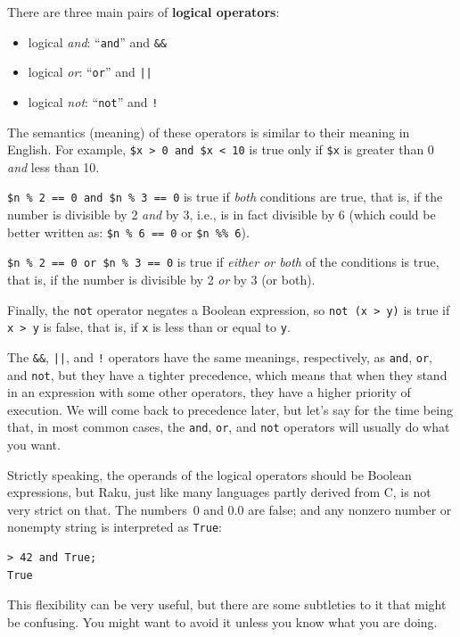 There are three main pairs of {\bf logical operators}: 
\begin{itemize}
\item logical \emph{and}: ``{\tt and}'' and {\tt \&\&}
\item logical \emph{or}: ``{\tt or}'' and {\tt ||}
\item logical \emph{not}: ``{\tt not}'' and {\tt !}
\end{itemize}

The semantics (meaning) of these operators is
similar to their meaning in English.  For example,
{\tt \$x > 0 and \$x < 10} is true only if {\tt \$x} is greater 
than 0 {\em and} less than 10.

{\tt \$n \% 2 == 0 and \$n \% 3 == 0} is true if {\em both} 
conditions are true, that is, if the number is divisible by 2
{\em and} by 3, i.e., is in fact divisible by 6 (which could be better 
written as: {\tt \$n \% 6 == 0} or {\tt \$n \%\% 6}).

{\tt \$n \% 2 == 0 or \$n \% 3 == 0} is true if {\em either or 
both} of the conditions is true, that is, if the number is 
divisible by 2 {\em or} by 3 (or both).

Finally, the {\tt not} operator negates a Boolean
expression, so {\tt not (x > y)} is true if {\tt x > y} 
is false, that is, if {\tt x} is less than or equal 
to {\tt y}.

The {\tt \&\&}, {\tt ||}, and {\tt !} operators have the same 
meanings, respectively, as {\tt and}, {\tt or}, and {\tt not}, 
but they have a tighter precedence, which means that when 
they stand in an expression with some other operators, 
they have a higher priority of execution. We will come 
back to precedence later, but let's say for the time being 
that, in most common cases, the {\tt and}, {\tt or}, and 
{\tt not} operators will usually do what you want.

Strictly speaking, the operands of the logical operators should 
be Boolean expressions, but Raku, just like many languages 
partly derived from C, is not very strict on that. The 
numbers~0 and 0.0 are false; and any nonzero number 
or nonempty string is interpreted as {\tt True}:

\begin{verbatim}
> 42 and True;
True
\end{verbatim}
%
This flexibility can be very useful, but there are some 
subtleties to it that might be confusing.  You might want 
to avoid it unless you know what you are doing.

